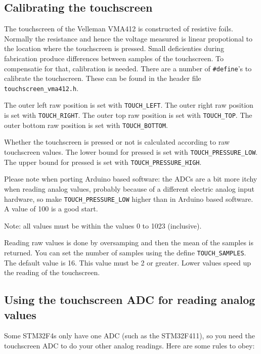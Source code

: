 \documentclass[12pt]{article}
\begin{document}
\subsection{Calibrating the touchscreen}
\label{sec:calibrating}
The touchscreen of the Velleman VMA412 is constructed of resistive foils. Normally the resistance and hence the voltage measured is linear propotional to the location where the touchscreen is pressed. Small deficienties during fabrication produce differences between samples of the touchscreen. To compensatie for that, calibration is needed. There are a number of \lstinline|#define|'s to calibrate the touchscreen. These can be found in the header file \lstinline|touchscreen_vma412.h|.

The outer left raw position is set with \lstinline|TOUCH_LEFT|. The outer right raw position is set with \lstinline|TOUCH_RIGHT|. The outer top raw position is set with \lstinline|TOUCH_TOP|. The outer bottom raw position is set with \lstinline|TOUCH_BOTTOM|.

Whether the touchscreen is pressed or not is calculated according to raw touchscreen values. The lower bound for pressed is set with \lstinline|TOUCH_PRESSURE_LOW|. The upper bound for pressed is set with \lstinline|TOUCH_PRESSURE_HIGH|.

Please note when porting Arduino based software: the ADCs are a bit more itchy when reading analog values, probably because of a different electric analog input hardware, so make \lstinline|TOUCH_PRESSURE_LOW| higher than in Arduino based software. A value of 100 is a good start.

Note: all values must be within the values 0 to 1023 (inclusive).

Reading raw values is done by oversamping and then the mean of the samples is returned. You can set the number of samples using the define \lstinline|TOUCH_SAMPLES|. The default value is 16. This value must be 2 or greater. Lower values speed up the reading of the touchscreen.

\subsection{Using the touchscreen ADC for reading analog values}
Some STM32F4s only have one ADC (such as the STM32F411), so you need the touchscreen ADC to do your other analog readings. Here are some rules to obey:
\end{document}
